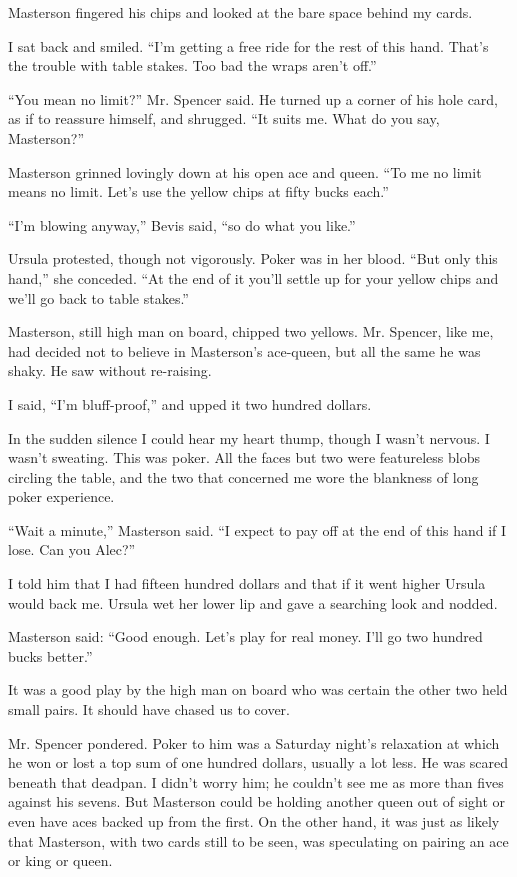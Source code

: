 \documentclass{novel}
\begin{document}
{Masterson fingered his chips and looked at the bare space behind my cards.

I sat back and smiled. “I’m getting a free ride for the rest of this hand. That’s the trouble with table stakes. Too bad the wraps aren’t off.”

“You mean no limit?” Mr. Spencer said. He turned up a corner of his hole card, as if to reassure himself, and shrugged. “It suits me. What do you say, Masterson?”

Masterson grinned lovingly down at his open ace and queen. “To me no limit means no limit. Let’s use the yellow chips at fifty bucks each.”

“I’m blowing anyway,” Bevis said, “so do what you like.”

Ursula protested, though not vigorously. Poker was in her blood. “But only this hand,” she conceded. “At the end of it you’ll settle up for your yellow chips and we’ll go back to table stakes.”

Masterson, still high man on board, chipped two yellows. Mr. Spencer, like me, had decided not to believe in Masterson’s ace-queen, but all the same he was shaky. He saw without re-raising.

I said, “I’m bluff-proof,” and upped it two hundred dollars.

In the sudden silence I could hear my heart thump, though I wasn’t nervous. I wasn’t sweating. This was poker. All the faces but two were featureless blobs circling the table, and the two that concerned me wore the blankness of long poker experience.

“Wait a minute,” Masterson said. “I expect to pay off at the end of this hand if I lose. Can you Alec?”

I told him that I had fifteen hundred dollars and that if it went higher Ursula would back me. Ursula wet her lower lip and gave a searching look and nodded.

Masterson said: “Good enough. Let’s play for real money. I’ll go two hundred bucks better.”

It was a good play by the high man on board who was certain the other two held small pairs. It should have chased us to cover.

Mr. Spencer pondered. Poker to him was a Saturday night’s relaxation at which he won or lost a top sum of one hundred dollars, usually a lot less. He was scared beneath that deadpan. I didn’t worry him; he couldn’t see me as more than fives against his sevens. But Masterson could be holding another queen out of sight or even have aces backed up from the first. On the other hand, it was just as likely that Masterson, with two cards still to be seen, was speculating on pairing an ace or king or queen.

}
\end{document}
